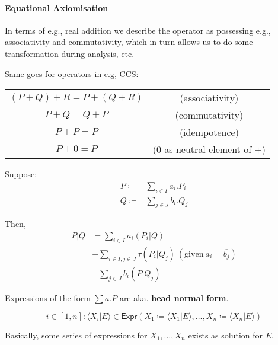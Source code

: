 \documentclass[99-notes-packed.tex]{subfiles}
\begin{document}
\paragraph*{Equational Axiomisation}
In terms of e.g., real addition we describe the operator as possessing e.g., associativity and commutativity, which in turn allows us to do some transformation during analysis, etc. 

Same goes for operators in e.g, CCS: 
\begin{center}
    \begin{tabular}{cc}
        $(P + Q) + R = P + (Q + R)$ & (associativity) \\
        $P + Q = Q + P$ & (commutativity) \\
        $P + P = P$ & (idempotence) \\
        $P + 0 = P$ & ($0$ as neutral element of $+$)
    \end{tabular}
\end{center}

\begin{definition}
    Suppose: 
    \begin{align*}
        P \coloneqq& \sum_{i \in I} a_i.P_i \\
        Q \coloneqq& \sum_{j \in J} b_i.Q_j
    \end{align*}

    Then, 
    \begin{align*}
        P | Q &= \sum_{i \in I} a_i(P_i | Q) \\
              &+ \sum_{i \in I, j \in J} \tau(P_i | Q_j)\ (\mathrm{given\ }a_i = \overline{b_j}) \\
              &+ \sum_{j \in J} b_i(P | Q_j)
    \end{align*}

    Expressions of the form $\sum a.P$ are aka. \textbf{head normal form}.
\end{definition}

\begin{definition}
    \begin{equation*}
        i \in [1, n]: \langle X_i | E \rangle \in \mathsf{Expr}(X_1 \coloneqq \langle X_1 | E \rangle, \dots, X_n \coloneqq \langle X_n | E \rangle)
    \end{equation*}

    Basically, some series of expressions for $X_1, \dots, X_n$ exists as solution for $E$. 
\end{definition}
\end{document}
